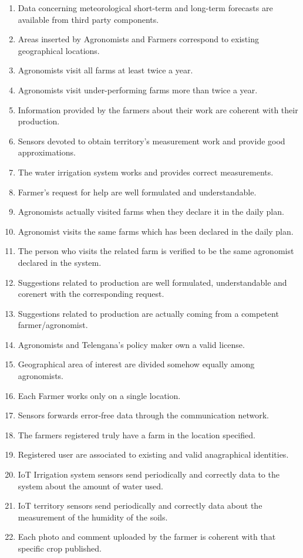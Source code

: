 	\begin{enumerate}[label=\textbf{DA\arabic*}]
		\item \label{dom:D1} Data concerning meteorological short-term and long-term forecasts are available from third party components. 	
		\item \label{dom:D2} Areas inserted by Agronomists and Farmers correspond to existing geographical locations.
		\item \label{dom:D3} Agronomists visit all farms at least twice a year.
		\item \label{dom:D4} Agronomists visit under-performing farms more than twice a year.
		\item \label{dom:D5} Information provided by the farmers about their work are coherent with their production.
		\item \label{dom:D6} Sensors devoted to obtain territory's measurement work and provide good approximations.
		\item \label{dom:D7} The water irrigation system works and provides correct measurements.
		\item \label{dom:D8} Farmer's request for help are well formulated and understandable.
		\item \label{dom:D9} Agronomists actually visited farms when they declare it in the daily plan.
		\item \label{dom:D10} Agronomist visits the same farms which has been declared in the daily plan.
		\item \label{dom:D11} The person who visits the related farm is verified to be the same agronomist declared in the system.
		\item \label{dom:D12} Suggestions related to production are well formulated, understandable and corenert with the corresponding request.
		\item \label{dom:D13} Suggestions related to production are actually coming from a competent farmer/agronomist.
		\item \label{dom:D14} Agronomists and Telengana's policy maker own a valid license.
		\item \label{dom:D15} Geographical area of interest are divided somehow equally among agronomists.
		\item \label{dom:D16} Each Farmer works only on a single location.
		\item \label{dom:D17} Sensors forwards error-free data through the communication network.
		\item \label{dom:D18} The farmers registered truly have a farm in the location specified.
		\item \label{dom:D19} Registered user are associated to existing and valid anagraphical identities.
		\item \label{dom:D20} IoT Irrigation system sensors send periodically and correctly data to the system about the amount of water used.
		\item \label{dom:D21} IoT territory sensors send periodically and correctly data about the measurement of the humidity of the soils.
		\item \label{dom:D22} Each photo and comment uploaded by the farmer is coherent with that specific crop published.
	\end{enumerate} 
	